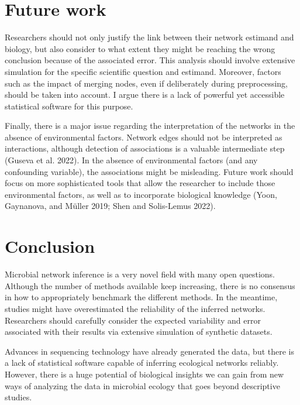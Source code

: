 \documentclass[
  a4paper,
]{article}
\begin{document}
\hypertarget{future-work}{%
\section{Future work}\label{future-work}}

Researchers should not only justify the link between their network
estimand and biology, but also consider to what extent they might be
reaching the wrong conclusion because of the associated error. This
analysis should involve extensive simulation for the specific scientific
question and estimand. Moreover, factors such as the impact of merging
nodes, even if deliberately during preprocessing, should be taken into
account. I argue there is a lack of powerful yet accessible statistical
software for this purpose.

Finally, there is a major issue regarding the interpretation of the
networks in the absence of environmental factors. Network edges should
not be interpreted as interactions, although detection of associations
is a valuable intermediate step (Guseva et al. 2022). In the absence of
environmental factors (and any confounding variable), the associations
might be misleading. Future work should focus on more sophisticated
tools that allow the researcher to include those environmental factors,
as well as to incorporate biological knowledge (Yoon, Gaynanova, and
Müller 2019; Shen and Solis-Lemus 2022).

\hypertarget{conclusion}{%
\section{Conclusion}\label{conclusion}}

Microbial network inference is a very novel field with many open
questions. Although the number of methods available keep increasing,
there is no consensus in how to appropriately benchmark the different
methods. In the meantime, studies might have overestimated the
reliability of the inferred networks. Researchers should carefully
consider the expected variability and error associated with their
results via extensive simulation of synthetic datasets.

Advances in sequencing technology have already generated the data, but
there is a lack of statistical software capable of inferring ecological
networks reliably. However, there is a huge potential of biological
insights we can gain from new ways of analyzing the data in microbial
ecology that goes beyond descriptive studies.
\end{document}
